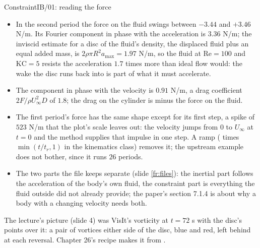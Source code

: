 \documentclass[aspectratio=169,11pt]{beamer}
\begin{document}
\begin{frame}{ConstraintIB/01: reading the force}
\label{fr:ex01c}
\footnotesize
\begin{itemize}
  \item In the second period the force on the fluid swings between $-3.44$ and $+3.46$ N/m. Its Fourier component in phase with the acceleration is $3.36$ N/m; the inviscid estimate for a disc of the fluid's density, the displaced fluid plus an equal added mass, is $2\rho\pi R^2 a_{\max} = 1.97$ N/m, so the fluid at $\mathrm{Re} = 100$ and $\mathrm{KC} = 5$ resists the acceleration $1.7$ times more than ideal flow would: the wake the disc runs back into is part of what it must accelerate.
  \item The component in phase with the velocity is $0.91$ N/m, a drag coefficient $2F/\rho U_\infty^2 D$ of $1.8$; the drag on the cylinder is minus the force on the fluid.
  \item The first period's force has the same shape except for its first step, a spike of $523$ N/m that the plot's scale leaves out: the velocity jumps from $0$ to $U_\infty$ at $t = 0$ and the method supplies that impulse in one step. A ramp ( times $\min(t/t_r, 1)$ in the kinematics class) removes it; the upstream example does not bother, since it runs $26$ periods.
  \item The two parts the file keeps separate (slide \ref{fr:files}): the inertial part follows the acceleration of the body's own fluid, the constraint part is everything the fluid outside did not already provide; the paper's section 7.1.4 is about why a body with a changing velocity needs both.
\end{itemize}
\vspace{1mm}

\scriptsize The lecture's picture (slide 4) was VisIt's vorticity at $t = 72$ s with the disc's points over it: a pair of vortices either side of the disc, blue and red, left behind at each reversal. Chapter 26's recipe makes it from .
\end{frame}
\end{document}
